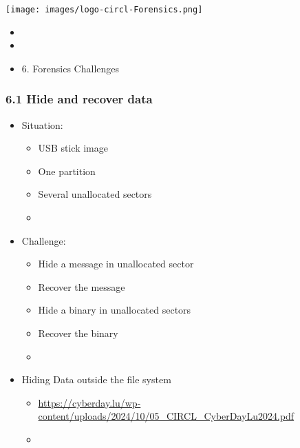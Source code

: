 %
%



\begin{frame}
    \texttt{[image: images/logo-circl-Forensics.png]}
    \begin{itemize}
        \item[]
        \item[]
        \item[] 6. Forensics Challenges
    \end{itemize}
\end{frame}


\begin{frame}[fragile]
  \frametitle{6.1 Hide and recover data}
  \begin{itemize}
    \item Situation:
    \begin{itemize}
      \item USB stick image
      \item One partition
      \item Several unallocated sectors
      \item[]
    \end{itemize}
    \item Challenge:
    \begin{itemize}
      \item Hide a message in unallocated sector
      \item Recover the message
      \item Hide a binary in unallocated sectors
      \item Recover the binary
      \item[]
    \end{itemize}
    \item Hiding Data outside the file system
    \begin{itemize}
	    \item[] \url{https://cyberday.lu/wp-content/uploads/2024/10/05\_CIRCL\_CyberDayLu2024.pdf} 
      \item[]
    \end{itemize}
  \end{itemize}
\end{frame}


